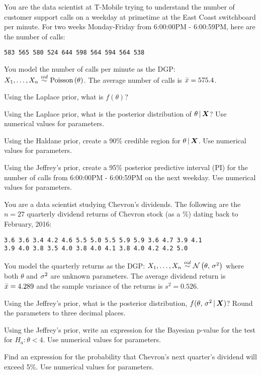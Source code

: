 \documentclass[12pt]{article}
\begin{document}
\problem You are the data scientist at T-Mobile trying to understand the number of customer support calls on a weekday at primetime at the East Coast switchboard per minute. For two weeks Monday-Friday from 6:00:00PM - 6:00:59PM, here are the number of calls:

\begin{verbatim}
583 565 580 524 644 598 564 594 564 538
\end{verbatim}

\noindent You model the number of calls per minute as the DGP: $\Xoneton \iid \poisson{\theta}$. The average number of calls is $\bar{x} = 575.4$.

\begin{enumerate}[(a)]

 Using the Laplace prior, what is $f(\theta)$?

 Using the Laplace prior, what is the posterior distribution of $\theta\,|\,\boldsymbol{X}$? Use numerical values for parameters. 

 Using the Haldane prior, create a 90\% credible region for $\theta\,|\,\boldsymbol{X}$. Use numerical values for parameters.

 Using the Jeffrey's prior, create a 95\% posterior predictive interval (PI) for the number of calls from 6:00:00PM - 6:00:59PM on the next weekday. Use numerical values for parameters.

\end{enumerate}

\problem You are a data scientist studying Chevron's dividends. The following are the $n=27$ quarterly dividend returns of Chevron stock (as a \%) dating back to February, 2016:

\begin{verbatim}
3.6 3.6 3.4 4.2 4.6 5.5 5.0 5.5 5.9 5.9 3.6 4.7 3.9 4.1 
3.9 4.0 3.8 3.5 4.0 3.8 4.0 4.1 3.8 4.0 4.2 4.2 5.0
\end{verbatim}

\noindent You model the quarterly returns as the DGP: $\Xoneton \iid \normnot{\theta}{\sigsq}$ where both $\theta$ and $\sigma^2$ are unknown parameters. The average dividend return is $\bar{x} = 4.289$ and the sample variance of the returns is $s^2 = 0.526$.



\begin{enumerate}[(a)]

 Using the Jeffrey's prior, what is the posterior distribution, $f(\theta,\,\sigma^2\,|\,\boldsymbol{X})$? Round the parameters to three decimal places.

 Using the Jeffrey's prior, write an expression for the Bayesian p-value for the test for $H_a: \theta < 4$. Use numerical values for parameters.

 Find an expression for the probability that Chevron's next quarter's dividend will exceed 5\%. Use numerical values for parameters.

\end{enumerate}
\pagebreak
\end{document}
